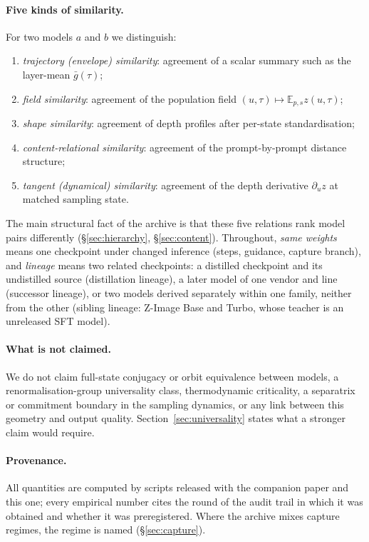 \documentclass[11pt]{article}
\theoremstyle{definition}
\newcommand{\E}{\mathbb{E}}
\begin{document}
\paragraph{Five kinds of similarity.} For two models $a$ and $b$ we distinguish:
\begin{enumerate}
 \item \emph{trajectory (envelope) similarity}: agreement of a scalar summary such as the layer-mean $\bar g(\tau)$;
 \item \emph{field similarity}: agreement of the population field $(u,\tau)\mapsto \E_{p,s} z(u,\tau)$;
 \item \emph{shape similarity}: agreement of depth profiles after per-state standardisation;
 \item \emph{content-relational similarity}: agreement of the prompt-by-prompt distance structure;
 \item \emph{tangent (dynamical) similarity}: agreement of the depth derivative $\partial_u z$ at matched sampling state.
\end{enumerate}
The main structural fact of the archive is that these five relations rank model pairs differently (\S\ref{sec:hierarchy}, \S\ref{sec:content}). Throughout, \emph{same weights} means one checkpoint under changed inference (steps, guidance, capture branch), and \emph{lineage} means two related checkpoints: a distilled checkpoint and its undistilled source (distillation lineage), a later model of one vendor and line (successor lineage), or two models derived separately within one family, neither from the other (sibling lineage: Z-Image Base and Turbo, whose teacher is an unreleased SFT model).

\paragraph{What is not claimed.} We do not claim full-state conjugacy or orbit equivalence between models, a renormalisation-group universality class, thermodynamic criticality, a separatrix or commitment boundary in the sampling dynamics, or any link between this geometry and output quality. Section~\ref{sec:universality} states what a stronger claim would require.

\paragraph{Provenance.} All quantities are computed by scripts released with the companion paper and this one; every empirical number cites the round of the audit trail in which it was obtained and whether it was preregistered. Where the archive mixes capture regimes, the regime is named (\S\ref{sec:capture}).
\end{document}
